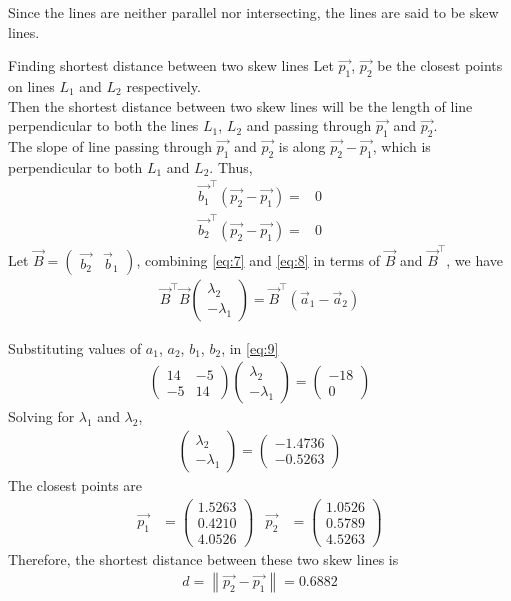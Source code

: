 \documentclass{beamer}
\providecommand{\brak}[1]{\ensuremath{\left(#1\right)}}
\newcommand{\myvec}[1]{\ensuremath{\begin{pmatrix}#1\end{pmatrix}}}
\newcommand\norm[1]{\left\lVert#1\right\rVert}
\begin{document}
\begin{frame}
Since the lines are neither parallel nor intersecting, the lines are said to be skew lines.
\begin{block}{Finding shortest distance between two skew lines}
Let $\Vec{p_{1}}$, $\Vec{p_{2}}$ be the closest points on lines $L_{1}$ and $L_{2}$ respectively.\\
Then the shortest distance between two skew lines will be the length of line perpendicular to both the lines $L_{1}$, $L_{2}$ and passing through $\Vec{p_{1}}$ and $\Vec{p_{2}}$.\\
The slope of line passing through $\Vec{p_{1}}$ and $\Vec{p_{2}}$ is along $\Vec{p_{2}}-\Vec{p_{1}}$, which is perpendicular to both $L_{1}$ and $L_{2}$. Thus,
\begin{align}
    \label{eq:7}
    \Vec{b_{1}}^\top\brak{\Vec{p_{2}}-\Vec{p_{1}}}={}&0\\
    \label{eq:8}
     \Vec{b_{2}}^\top\brak{\Vec{p_{2}}-\Vec{p_{1}}}={}&0
\end{align}
Let $\Vec{B}=\myvec{\Vec{b_{2}} & \Vec{b}_{1}}$, combining \eqref{eq:7} and \eqref{eq:8} in terms of $\Vec{B}$ and $\Vec{B}^\top$, we have
\begin{align}
    \label{eq:9}
    \Vec{B}^\top\Vec{B}\myvec{\lambda_{2} \\ -\lambda_{1}}= \Vec{B}^\top\brak{\Vec{a}_{1} - \Vec{a}_{2}}
\end{align} 
\end{block}
\end{frame}
\begin{frame}
Substituting values of $a_{1}$, $a_{2}$, $b_{1}$, $b_{2}$, in \eqref{eq:9}
\begin{align}
    \label{eq:10}
    \myvec{14 & -5 \\ -5 & 14}\myvec{\lambda_{2} \\ -\lambda_{1}}=\myvec{-18 \\ 0}
\end{align}
Solving for $\lambda_{1}$ and $\lambda_{2}$, 
\begin{align}
    \label{eq:11}
    \myvec{\lambda_{2} \\ -\lambda_{1}}=\myvec{-1.4736 \\ -0.5263}
\end{align}
The closest points are
\begin{align}
    \label{eq:12}
    \Vec{p_{1}} &= \myvec{1.5263\\ 0.4210 \\ 4.0526 }   &    \Vec{p_{2}}&=\myvec{ 1.0526\\0.5789\\4.5263}
\end{align}
Therefore, the shortest distance between these two skew lines is
\begin{align}
    \label{eq:18}
    d = \norm{\Vec{p_{2}}-\Vec{p_{1}}} = 0.6882
\end{align}
\end{frame}
\end{document}
